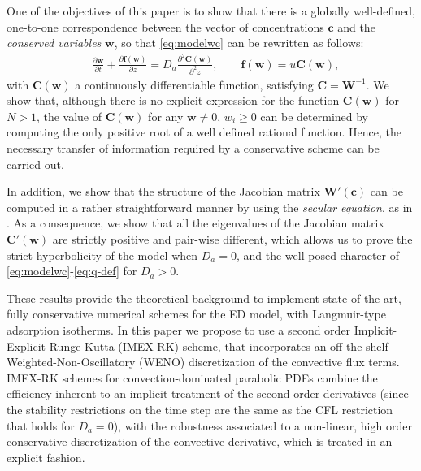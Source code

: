 \documentclass[preprint]{elsarticle}
\theoremstyle{definition}
\newcommand{\bw}{\boldsymbol w}
\newcommand{\bW}{\boldsymbol W}
\newcommand{\bc}{\boldsymbol c}
\newcommand{\bC}{\boldsymbol C}
\begin{document}
One of the objectives of this paper is to show that there is a
globally well-defined,
one-to-one co\-rres\-pondence between  the vector
of concentrations $\bc$ and the {\em conserved variables} $\bw$,  so that \eqref{eq:modelwc} can
be rewritten as follows:  
\begin{align} \label{eq:modelwc1}
&\frac{\partial \bw}{\partial t} + \frac{\partial \boldsymbol{f}(\bw)}{\partial
  z}=D_a \frac{\partial^2 \bC(\bw)}{\partial^2 z}, \qquad
\boldsymbol{f}(\bw)=u \bC(\bw),\end{align}
with $\bC(\bw)$ a continuously 
differentiable function, satisfying
$\bC=\bW^{-1}$.  We show that, although there is no explicit expression for the
 function $\bC(\bw)$ for $N>1$, the value of   $\bC(\bw)$  for any
 $\bw\neq 0$, $w_i\geq 0$ can be
 determined by computing the only 
positive root of a well defined rational function. Hence,  the
necessary transfer of information required by a 
conservative scheme can be  carried out.

 In addition, we show that the structure of the Jacobian matrix
  $\bW'(\bc)$ can be computed in a rather straightforward manner by
  using the {\em secular equation}, as 
  in \cite{Donat3}. As a consequence, we show that all the
  eigenvalues of the  Jacobian matrix
  $\bC'(\bw)$ are strictly positive and pair-wise different, which
  allows us to prove  the  strict hyperbolicity of 
  the model when   $D_a=0$, and the well-posed character of
  \eqref{eq:modelwc}-\eqref{eq:q-def}  for $D_a>0$.

 These 
  results provide the theoretical background to 
  implement state-of-the-art,  fully
conservative numerical schemes 
for the ED model, with Langmuir-type adsorption isotherms. In this paper we
propose to use a second order Implicit-Explicit
 Runge-Kutta (IMEX-RK) scheme, that incorporates an off-the shelf
 Weighted-Non-Oscillatory (WENO) discretization of the convective flux
 terms. IMEX-RK schemes for convection-dominated parabolic PDEs
 combine the efficiency inherent to an implicit treatment of the
 second order derivatives (since the stability restrictions on the
 time step are the same as the CFL restriction that holds for
 $D_a=0$), with the robustness associated to a non-linear, high order
 conservative discretization of the convective derivative, which is
 treated in an  explicit fashion.
 
 
\end{document}
